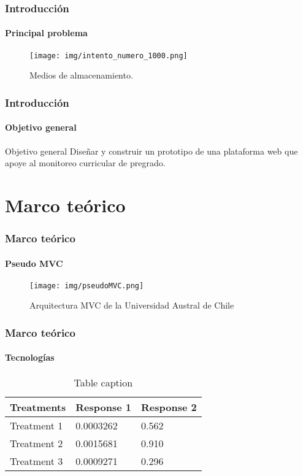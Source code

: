 \documentclass{beamer}
\begin{document}
\begin{frame}    
\frametitle{Introducción}   
    \framesubtitle{Principal problema}

    
    \begin{figure}
        \texttt{[image: img/intento\_numero\_1000.png]}
        \caption{Medios de almacenamiento.}
    \end{figure}        
\end{frame} 






\begin{frame}
\frametitle{Introducción}
\framesubtitle{Objetivo general}
\pause
\begin{block}{Objetivo general}
	Diseñar y construir  un prototipo de una plataforma web que apoye al monitoreo curricular de pregrado.
\end{block}
\end{frame}







\section{Marco teórico}

\begin{frame}
\frametitle{Marco teórico}
\framesubtitle{Pseudo MVC}
    \begin{figure}
        \texttt{[image: img/pseudoMVC.png]}
        \caption{Arquitectura MVC de la Universidad Austral de Chile}
    \end{figure}  
\end{frame}

\begin{frame}
\frametitle{Marco teórico}
\framesubtitle{Tecnologías}
\begin{table}
\begin{tabular}{l l l}
\toprule
\textbf{Treatments} & \textbf{Response 1} & \textbf{Response 2}\\
\midrule
Treatment 1 & 0.0003262 & 0.562 \\
Treatment 2 & 0.0015681 & 0.910 \\
Treatment 3 & 0.0009271 & 0.296 \\
\bottomrule
\end{tabular}
\caption{Table caption}
\end{table}
\end{frame}
\end{document}
